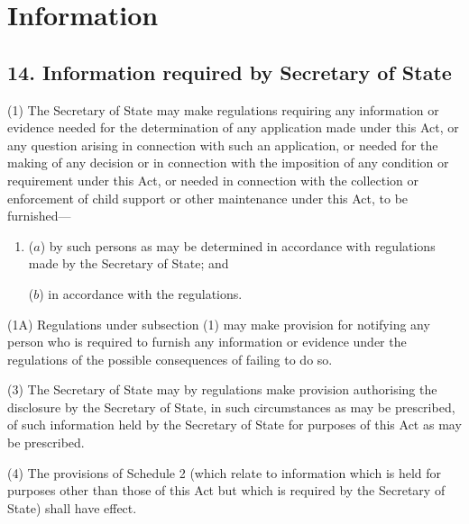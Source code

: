 \documentclass[12pt,a4paper]{article}
\begin{document}
\section{Information}

\subsection{14. Information required by Secretary of State}

(1) The Secretary of State may make regulations requiring any information or
evidence needed for the determination of any application made under this Act,
or any question arising in connection with such an application, or needed for
the making of any decision or in connection with the imposition of any condition or
requirement under this Act, or needed in connection with the collection or
enforcement of child support or other maintenance under this Act, to be furnished---
\begin{enumerate}\item[]
($a$)
by such persons as may be determined in accordance with regulations
made by the Secretary of State; and

($b$)
in accordance with the regulations.
\end{enumerate}

(1A)
Regulations under subsection (1) may make provision for notifying any
person who is required to furnish any information or evidence under the regulations of
the possible consequences of failing to do so.

(3)
The Secretary of State may by regulations make provision authorising the
disclosure by the Secretary of State, in such circumstances as may be prescribed,
of such information held by the Secretary of State for purposes of this Act as may be
prescribed.

(4)
The provisions of Schedule 2 (which relate to information which is held for
purposes other than those of this Act but which is required by the Secretary of State)
shall have effect. 

\end{document}
